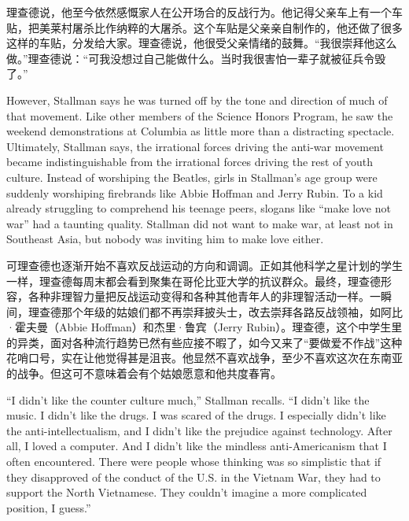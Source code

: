 \ifdefined\chs
理查德说，他至今依然感慨家人在公开场合的反战行为。他记得父亲车上有一个车贴，把美莱村屠杀比作纳粹的大屠杀。这个车贴是父亲亲自制作的，他还做了很多这样的车贴，分发给大家。理查德说，他很受父亲情绪的鼓舞。“我很崇拜他这么做。”理查德说：“可我没想过自己能做什么。当时我很害怕一辈子就被征兵令毁了。”
\fi

\ifdefined\eng
However, Stallman says he was turned off by the tone and direction of much of that movement. Like other members of the Science Honors Program, he saw the weekend demonstrations at Columbia as little more than a distracting spectacle. Ultimately, Stallman says, the irrational forces driving the anti-war movement became indistinguishable from the irrational forces driving the rest of youth culture. Instead of worshiping the Beatles, girls in Stallman's age group were suddenly worshiping firebrands like Abbie Hoffman and Jerry Rubin. To a kid already struggling to comprehend his teenage peers, slogans like ``make love not war'' had a taunting quality. Stallman did not want to make war, at least not in Southeast Asia, but nobody was inviting him to make love either.
\fi

\ifdefined\chs
可理查德也逐渐开始不喜欢反战运动的方向和调调。正如其他科学之星计划的学生一样，理查德每周末都会看到聚集在哥伦比亚大学的抗议群众。最终，理查德形容，各种非理智力量把反战运动变得和各种其他青年人的非理智活动一样。一瞬间，理查德那个年级的姑娘们都不再崇拜披头士，改去崇拜各路反战领袖，如阿比·霍夫曼（Abbie Hoffman）和杰里·鲁宾（Jerry Rubin）。理查德，这个中学生里的异类，面对各种流行趋势已然有些应接不暇了，如今又来了“要做爱不作战”这种花哨口号，实在让他觉得甚是沮丧。他显然不喜欢战争，至少不喜欢这次在东南亚的战争。但这可不意味着会有个姑娘愿意和他共度春宵。
\fi

\ifdefined\eng
``I didn't like the counter culture much,'' Stallman recalls. ``I didn't like the music. I didn't like the drugs. I was scared of the drugs. I especially didn't like the anti-intellectualism, and I didn't like the prejudice against technology. After all, I loved a computer. And I didn't like the mindless anti-Americanism that I often encountered. There were people whose thinking was so simplistic that if they disapproved of the conduct of the U.S. in the Vietnam War, they had to support the North Vietnamese. They couldn't imagine a more complicated position, I guess.''
\fi


